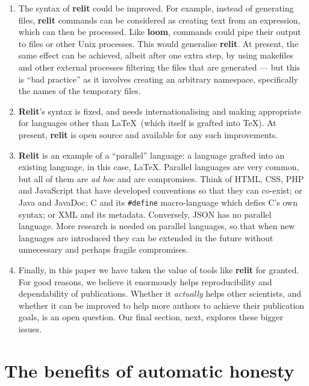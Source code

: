 \documentclass[12pt]{article}
\def\name#1{\textbf{#1}}
\begin{document}
\begin{enumerate}\raggedright
\item
The syntax of \name{relit} could be improved. For example, instead of generating files, \name{relit} commands can be considered as creating text from an expression, which can then be processed. Like \name{loom}, commands could pipe their output to files or other Unix processes. This would generalise \name{relit}. At present, the same effect can be achieved, albeit after one extra step, by using makefiles and other external processes filtering the files that are generated --- but this is ``bad practice'' as it involves creating an arbitrary namespace, specifically the names of the temporary files.

\item
\name{Relit}'s syntax is fixed, and needs internationalising and making appropriate for  languages other than \LaTeX\ (which itself is grafted into \TeX). At present, \name{relit} is open source and available for any such improvements.

\item
\name{Relit} is an example of a ``parallel'' language: a language grafted into an existing language, in this case, \LaTeX. Parallel languages are very common, but all of them are \emph{ad hoc\/} and are compromises. Think of HTML, CSS, PHP and JavaScript that have developed conventions so that they can co-exist; or Java and JavaDoc; C and its \texttt{\#define} macro-language which defies C's own syntax; or XML and its metadata. Conversely, JSON has no parallel language.  More research is needed on parallel languages, so that when new languages are introduced they can be extended in the future without unnecessary and perhaps fragile compromises.
\item
Finally, in this paper we have taken the value of tools like \name{relit} for granted. For good reasons, we believe it enormously helps reproducibility and dependability of publications. Whether it \emph{actually\/} helps other scientists, and whether it can be improved to help more authors to achieve their publication goals, is an open question. Our final section, next, explores these bigger issues. 
\end{enumerate}

\section{The benefits of automatic honesty}\label{benefits}
\def\startquote{\sf\raggedright\setbox0=\hbox{``}\hskip -\wd0 \copy0}
\def\quoteend{''}
\end{document}
